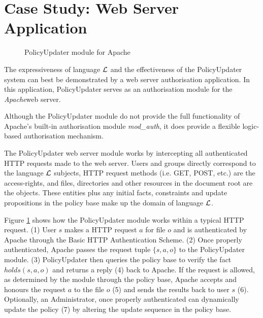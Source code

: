 \documentclass[11pt, twocolumn]{article}
\makeatletter
\newcommand{\vappsection}[1]{
  \renewcommand{\@seccntformat}[1]{
    \appendixname\hspace{0.5em}\csname the##1\endcsname \hspace{1em}
  }
  \section{#1}
  \renewcommand{\@seccntformat}[1]{
    \csname the##1\endcsname\hspace{1em}
  }
}
\makeatother
\begin{document}
  \appendix

  \vappsection{Case Study: Web Server Application}
    \label{app-case}

    \begin{figure}[ht]
      \begin{center}
        \caption{PolicyUpdater module for Apache}
        \label{fig-3}
      \end{center}
    \end{figure}

    The expressiveness of language $\cal{L}$ and the effectiveness of the
    PolicyUpdater system can best be demonstrated by a web server
    authorisation application. In this application, PolicyUpdater serves as
    an authorisation module for the {\em Apache}\footnotemark web server.


    Although the PolicyUpdater module do not provide the full functionality
    of Apache's built-in authorisation module {\em mod\_auth}, it does
    provide a flexible logic-based authorisation mechanism.

    The PolicyUpdater web server module works by intercepting all authenticated
    HTTP requests made to the web server. Users and groups directly correspond
    to the language $\cal{L}$ subjects, HTTP request methods (i.e. GET, POST,
    etc.) are the access-rights, and files, directories and other resources
    in the document root are the objects. These entities plus any initial
    facts, constraints and update propositions in the policy base make up the
    domain of language $\cal{L}$.

    Figure \ref{fig-3} shows how the PolicyUpdater module works within a
    typical HTTP request. (1) User $s$ makes a HTTP request $a$ for file
    $o$ and is authenticated by Apache through the Basic HTTP Authentication
    Scheme. (2) Once properly authenticated, Apache passes the request tuple
    $\{s, a, o\}$ to the PolicyUpdater module. (3) PolicyUpdater then queries
    the policy base to verify the fact $holds(s, a, o)$ and returns a reply
    (4) back to Apache. If the request is allowed, as determined by the
    module through the policy base, Apache accepts and honours the request
    $a$ to the file $o$ (5) and sends the results back to user $s$ (6).
    Optionally, an Administrator, once properly authenticated can dynamically
    update the policy (7) by altering the update sequence in the policy base.
\end{document}
